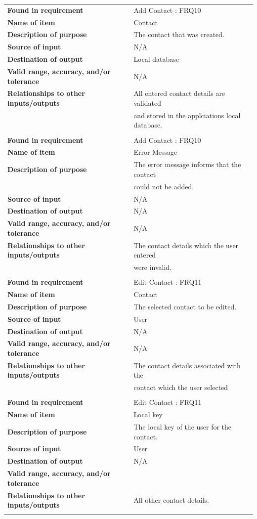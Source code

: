 \begin{tabular}{ll}
\textbf{Found in requirement}&Add Contact : FRQ10\\
\textbf{Name of item}&Contact\\
\textbf{Description of purpose}&The contact that was created.\\
\textbf{Source of input}&N/A\\
\textbf{Destination of output}&Local database\\
\textbf{Valid range, accuracy, and/or tolerance}&N/A\\
\textbf{Relationships to other inputs/outputs}&All entered contact details are validated\\& and stored in the applciations local database.\\
&\\
\textbf{Found in requirement}&Add Contact : FRQ10\\
\textbf{Name of item}&Error Message\\
\textbf{Description of purpose}&The error message informs that the contact\\& could not be added.\\
\textbf{Source of input}&N/A\\
\textbf{Destination of output}&N/A\\
\textbf{Valid range, accuracy, and/or tolerance}&N/A\\
\textbf{Relationships to other inputs/outputs}&The contact details which the user entered\\& were invalid.\\
&\\
\textbf{Found in requirement}&Edit Contact : FRQ11\\
\textbf{Name of item}&Contact\\
\textbf{Description of purpose}&The selected contact to be edited.\\
\textbf{Source of input}&User\\
\textbf{Destination of output}&N/A\\
\textbf{Valid range, accuracy, and/or tolerance}&N/A\\
\textbf{Relationships to other inputs/outputs}&The contact details associated with the \\&contact which the user selected\\
&\\
\textbf{Found in requirement}&Edit Contact : FRQ11\\
\textbf{Name of item}&Local key\\
\textbf{Description of purpose}&The local key of the user for the contact.\\
\textbf{Source of input}&User\\
\textbf{Destination of output}&N/A\\
\textbf{Valid range, accuracy, and/or tolerance}&\\
\textbf{Relationships to other inputs/outputs}&All other contact details.\\
&\\
\end{tabular}
